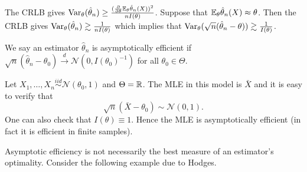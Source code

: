 \begin{remark}
	The CRLB gives $\operatorname{Var}_{\theta} (\hat \theta_n) \geq \frac{(\frac{\partial}{\partial \theta} \mathbb{E}_\theta \hat \theta_n (X))^2}{n I(\theta)}$. Suppose that $\mathbb{E}_\theta \hat \theta_n (X) \approx \theta$. Then the CRLB gives $\operatorname{Var}_{\theta} (\hat \theta_n) \gtrsim \frac{1}{nI(\theta)}$ which implies that $\operatorname{Var}_{\theta} (\sqrt{n}(\hat \theta_n - \theta)) \gtrsim \frac{1}{I(\theta)}$.
\end{remark}

\begin{definition}
	We say an estimator $\hat \theta_n$ is asymptotically efficient if $\sqrt{n}(\hat \theta_n - \theta_0) \overset{d}{\to} \mathcal{N}(0, I(\theta_0)^{-1})$ for all $\theta_0 \in \Theta$. 
\end{definition}

\begin{example}
	Let $X_1, \dots, X_n \overset{iid}{\sim} \mathcal{N}(\theta_0, 1)$ and $\Theta = \mathbb{R}$. The MLE in this model is $\bar X$ and it is easy to verify that \[
		\sqrt{n}(\bar X - \theta_0) \sim \mathcal N(0, 1).
	\] One can also check that $I(\theta) \equiv 1$. Hence the MLE is asymptotically efficient (in fact it is efficient in finite samples).
\end{example}

\noindent Asymptotic efficiency is not necessarily the best measure of an estimator's optimality. Consider the following example due to Hodges.

